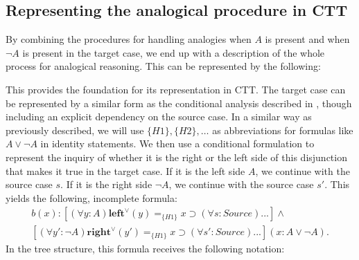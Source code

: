 	\subsection{Representing the analogical procedure in CTT}
		
		By combining the procedures for handling analogies when $A$ is present and when $\neg A$ is present in the target case, we end up with a description of the whole process for analogical reasoning. This can be represented by the following: \medskip
		
			\noindent\begin{minipage}{0.9\textwidth} %
			\end{minipage}
		

		This provides the foundation for its representation in CTT. The target case can be represented by a similar form as the conditional analysis described in \textcite{Rahman2019}, though including an explicit dependency on the source case. In a similar way as previously described, we will use $\{H1\},\{H2\}, \hdots$ as abbreviations for formulas like $A \lor \neg A$ in identity statements. We then use a conditional formulation to represent the inquiry of whether it is the right or the left side of this disjunction that makes it true in the target case. If it is the left side $A$, we continue with the source case $s$. If it is the right side $\neg A$, we continue with the source case $s'$. This yields the following, incomplete formula:
				\begin{multline*}
					b(x) : [(\forall y : A) \textbf{left}^\lor(y) =_{\{H1\}} x \supset (\forall s : Source) ...] \land \\
					[(\forall y' : \neg A) \textbf{right}^\lor(y') =_{\{H1\}} x \supset (\forall s' : Source) ...] (x : A \lor \neg A).
				\end{multline*}
			In the tree structure, this formula receives the following notation: \newline \medskip


